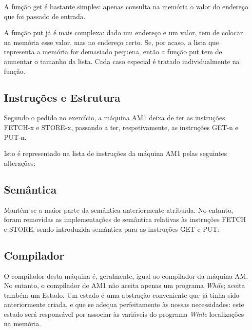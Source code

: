 \documentclass[11pt,a4paper]{report}
\newcommand{\while}[0]{\textit{While}\xspace}
\begin{document}
\par A função get é bastante simples: apenas consulta na memória o valor do endereço que foi passado de entrada.

\par A função put já é mais complexa: dado um endereço e um valor, tem de colocar na memória esse valor, mas no endereço certo. Se, por acaso, a lista que representa a memória for demasiado pequena, então a função put tem de aumentar o tamanho da lista. Cada caso especial é tratado individualmente na função.

\subsection{Instruções e Estrutura} \label{subsection:estrutura-maquina-am1}

\par Segundo o pedido no exercício, a máquina AM1 deixa de ter as instruções FETCH-x e STORE-x, passando a ter, respetivamente, as instruções GET-n e PUT-n.

\par Isto é representado na lista de instruções da máquina AM1 pelas seguintes alterações:

\subsection{Semântica} \label{subsection:semantica-maquina-am1}

\par Mantém-se a maior parte da semântica anteriormente atribuída. No entanto, foram removidas as implementações de semântica relativas às instruções FETCH e STORE, sendo introduzida semântica para as instruções GET e PUT:

\subsection{Compilador} \label{subsection:compilador-maquina-am1}

\par O compilador desta máquina é, geralmente, igual ao compilador da máquina AM. No entanto, o compilador de AM1 não aceita apenas um programa \while; aceita também um Estado. Um estado é uma abstração conveniente que já tinha sido anteriormente criada, e que se adequa perfeitamente às nossas necessidades: este estado será responsável por associar às variáveis do programa \while localizações na memória.
\end{document}
